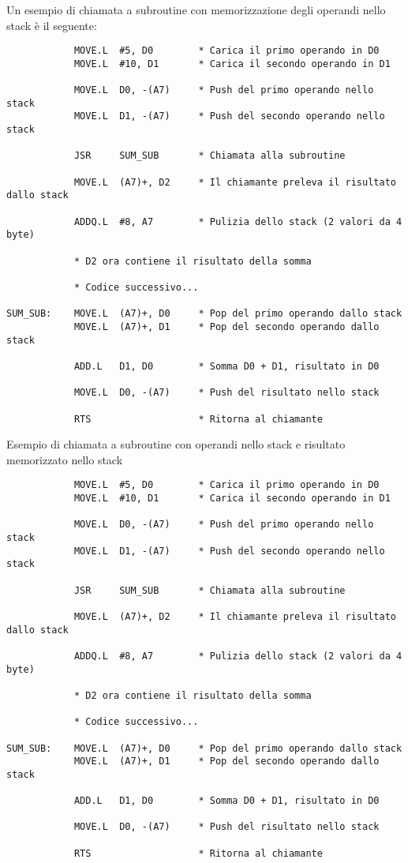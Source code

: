 Un esempio di chiamata a subroutine con memorizzazione degli operandi nello stack è il seguente:
\begin{lstlisting}
            MOVE.L  #5, D0        * Carica il primo operando in D0
            MOVE.L  #10, D1       * Carica il secondo operando in D1

            MOVE.L  D0, -(A7)     * Push del primo operando nello stack
            MOVE.L  D1, -(A7)     * Push del secondo operando nello stack

            JSR     SUM_SUB       * Chiamata alla subroutine

            MOVE.L  (A7)+, D2     * Il chiamante preleva il risultato dallo stack

            ADDQ.L  #8, A7        * Pulizia dello stack (2 valori da 4 byte)

            * D2 ora contiene il risultato della somma

            * Codice successivo...

SUM_SUB:    MOVE.L  (A7)+, D0     * Pop del primo operando dallo stack
            MOVE.L  (A7)+, D1     * Pop del secondo operando dallo stack

            ADD.L   D1, D0        * Somma D0 + D1, risultato in D0

            MOVE.L  D0, -(A7)     * Push del risultato nello stack

            RTS                   * Ritorna al chiamante
\end{lstlisting}
\newpage
Esempio di chiamata a subroutine con operandi nello stack e risultato memorizzato nello stack
\begin{lstlisting}
            MOVE.L  #5, D0        * Carica il primo operando in D0
            MOVE.L  #10, D1       * Carica il secondo operando in D1

            MOVE.L  D0, -(A7)     * Push del primo operando nello stack
            MOVE.L  D1, -(A7)     * Push del secondo operando nello stack

            JSR     SUM_SUB       * Chiamata alla subroutine

            MOVE.L  (A7)+, D2     * Il chiamante preleva il risultato dallo stack

            ADDQ.L  #8, A7        * Pulizia dello stack (2 valori da 4 byte)

            * D2 ora contiene il risultato della somma

            * Codice successivo...

SUM_SUB:    MOVE.L  (A7)+, D0     * Pop del primo operando dallo stack
            MOVE.L  (A7)+, D1     * Pop del secondo operando dallo stack

            ADD.L   D1, D0        * Somma D0 + D1, risultato in D0

            MOVE.L  D0, -(A7)     * Push del risultato nello stack

            RTS                   * Ritorna al chiamante
\end{lstlisting}

